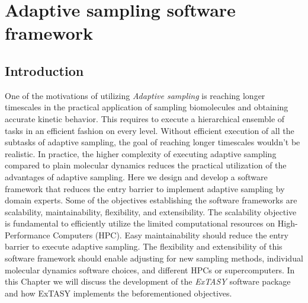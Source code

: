 \afterpage{\null\newpage}
\chapter{Adaptive sampling software framework\label{ch:chapter4}}
\section{\label{sec:intro4}Introduction}

One of the motivations of utilizing \emph{Adaptive sampling} is reaching longer timescales in the practical application of sampling biomolecules and obtaining accurate kinetic behavior. This requires to execute a hierarchical ensemble of tasks in an efficient fashion on every level. Without efficient execution of all the subtasks of adaptive sampling, the goal of reaching longer timescales wouldn't be realistic. In practice, the higher complexity of executing adaptive sampling compared to plain molecular dynamics reduces the practical utilization of the advantages of adaptive sampling. Here we design and develop a software framework that reduces the entry barrier to implement adaptive sampling by domain experts. Some of the objectives establishing the software frameworks are scalability, maintainability, flexibility, and extensibility.
The scalability objective is fundamental to efficiently utilize the limited computational resources on High-Performance Computers (HPC). Easy maintainability should reduce the entry barrier to execute adaptive sampling. The flexibility and extensibility of this software framework should enable adjusting for new sampling methods, individual molecular dynamics software choices, and different HPCs or supercomputers. In this Chapter we will discuss the development of the \emph{ExTASY} software package and how ExTASY implements the beforementioned objectives.

